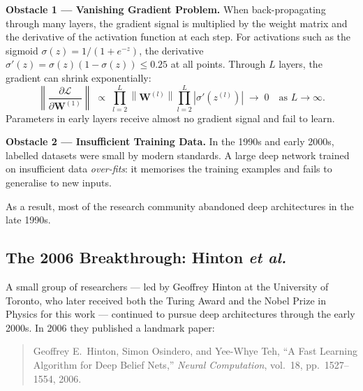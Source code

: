 \documentclass[12pt,a4paper]{article}
\begin{document}
\begin{warningbox}
\textbf{Obstacle 1 — Vanishing Gradient Problem.}
When back-propagating through many layers, the gradient signal is multiplied
by the weight matrix and the derivative of the activation function at each
step.  For activations such as the sigmoid $\sigma(z) = 1/(1+e^{-z})$, the
derivative $\sigma'(z) = \sigma(z)(1-\sigma(z)) \leq 0.25$ at all points.
Through $L$ layers, the gradient can shrink exponentially:
\begin{equation}
  \label{eq:vanishing}
  \left\|\frac{\partial \mathcal{L}}{\partial \mathbf{W}^{(1)}}\right\|
  \;\propto\; \prod_{l=2}^{L} \left\|\mathbf{W}^{(l)}\right\|
              \prod_{l=2}^{L} \left|\sigma'\!\left(z^{(l)}\right)\right|
  \;\longrightarrow\; 0 \quad \text{as } L \to \infty.
\end{equation}
Parameters in early layers receive almost no gradient signal and fail to learn.

\textbf{Obstacle 2 — Insufficient Training Data.}
In the 1990s and early 2000s, labelled datasets were small by modern
standards.  A large deep network trained on insufficient data
\emph{over-fits}: it memorises the training examples and fails to generalise
to new inputs.
\end{warningbox}

As a result, most of the research community abandoned deep architectures in
the late 1990s.

\subsection{The 2006 Breakthrough: Hinton \emph{et al.}}
\label{subsec:hinton2006}

A small group of researchers — led by Geoffrey Hinton at the University of
Toronto, who later received both the Turing Award and the Nobel Prize in
Physics for this work — continued to pursue deep architectures through the
early 2000s.  In 2006 they published a landmark paper:

\begin{quote}
Geoffrey E.\ Hinton, Simon Osindero, and Yee-Whye Teh,
``A Fast Learning Algorithm for Deep Belief Nets,''
\emph{Neural Computation}, vol.\ 18, pp.\ 1527--1554, 2006.
\end{quote}
\end{document}
